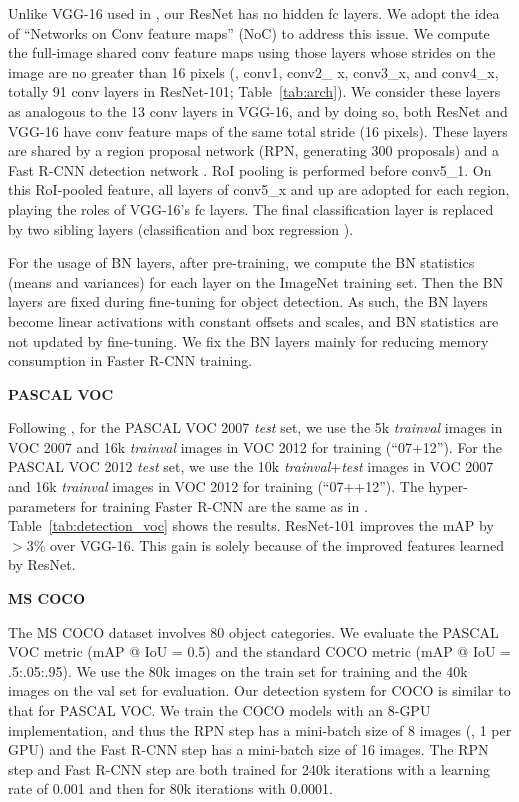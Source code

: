 Unlike VGG-16 used in \cite{Ren2015}, our ResNet has no hidden fc layers. We adopt the idea of ``Networks on Conv feature maps'' (NoC) \cite{Ren2015a} to address this issue.
We compute the full-image shared conv feature maps using those layers whose strides on the image are no greater than 16 pixels (\ie, conv1, conv2\_ x, conv3\_x, and conv4\_x, totally 91 conv layers in ResNet-101; Table~\ref{tab:arch}). We consider these layers as analogous to the 13 conv layers in VGG-16, and by doing so, both ResNet and VGG-16 have conv feature maps of the same total stride (16 pixels).
These layers are shared by a region proposal network (RPN, generating 300 proposals) \cite{Ren2015} and a Fast R-CNN detection network \cite{Girshick2015}.
RoI pooling \cite{Girshick2015} is performed before conv5\_1. On this RoI-pooled feature, all layers of conv5\_x and up are adopted for each region, playing the roles of VGG-16's fc layers.
The final classification layer is replaced by two sibling layers (classification and box regression \cite{Girshick2015}).

For the usage of BN layers, after pre-training, we compute the BN statistics (means and variances) for each layer on the ImageNet training set. Then the BN layers are fixed during fine-tuning for object detection. As such, the BN layers become linear activations with constant offsets and scales, and BN statistics are not updated by fine-tuning. We fix the BN layers mainly for reducing memory consumption in Faster R-CNN training.


\vspace{.5em}
\noindent\textbf{PASCAL VOC}

Following \cite{Girshick2015,Ren2015}, for the PASCAL VOC 2007 \emph{test} set, we use the 5k \emph{trainval} images in VOC 2007 and 16k \emph{trainval} images in VOC 2012 for training (``07+12''). For the PASCAL VOC 2012 \emph{test} set, we use the 10k \emph{trainval}+\emph{test} images in VOC 2007 and 16k \emph{trainval} images in VOC 2012 for training (``07++12''). The hyper-parameters for training Faster R-CNN are the same as in \cite{Ren2015}.
Table~\ref{tab:detection_voc} shows the results. ResNet-101 improves the mAP by $>$3\% over VGG-16. This gain is solely because of the improved features learned by ResNet.



\vspace{.5em}
\noindent\textbf{MS COCO}

The MS COCO dataset \cite{Lin2014} involves 80 object categories. We evaluate the PASCAL VOC metric (mAP @ IoU = 0.5) and the standard COCO metric (mAP @ IoU = .5:.05:.95). We use the 80k images on the train set for training and the 40k images on the val set for evaluation.
Our detection system for COCO is similar to that for PASCAL VOC.
We train the COCO models with an 8-GPU implementation, and thus the RPN step has a mini-batch size of 8 images (\ie, 1 per GPU) and the Fast R-CNN step has a mini-batch size of 16 images. The RPN step and Fast R-CNN step are both trained for 240k iterations with a learning rate of 0.001 and then for 80k iterations with 0.0001.


